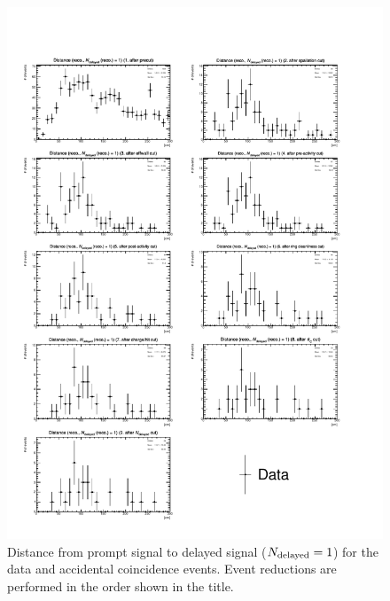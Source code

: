 \begin{figure}[h]
	\centering
	\includegraphics[width=15cm]{PDF/Dist_Data/Che_50deg_tag_ge1/RecoDisCap_1}
	\caption[Distance from prompt signal to delayed signal ($N_{\rm delayed}=1$) for the data and accidental coincidence events]{
	Distance from prompt signal to delayed signal ($N_{\rm delayed}=1$) for the data and accidental coincidence events.
	Event reductions are performed in the order shown in the title.
	}\label{Data_RecoDisCap_1}
\end{figure}

